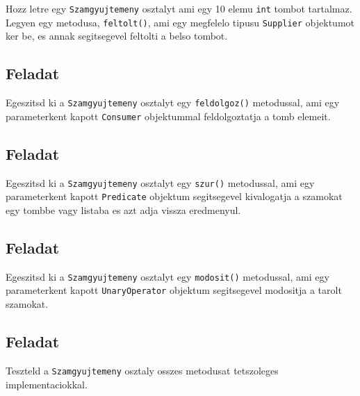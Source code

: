 \documentclass{article}
\let\l\lstinline
\begin{document}
Hozz letre egy \l{Szamgyujtemeny} osztalyt ami egy 10 elemu \l{int} tombot tartalmaz. Legyen egy metodusa, \l{feltolt()}, ami egy megfelelo tipusu \l{Supplier} objektumot ker be, es annak segitsegevel feltolti a belso tombot.

\subsection{Feladat}

Egeszitsd ki a \l{Szamgyujtemeny} osztalyt egy \l{feldolgoz()} metodussal, ami egy parameterkent kapott \l{Consumer} objektummal feldolgoztatja a tomb elemeit.

\subsection{Feladat}

Egeszitsd ki a \l{Szamgyujtemeny} osztalyt egy \l{szur()} metodussal, ami egy parameterkent kapott \l{Predicate} objektum segitsegevel kivalogatja a szamokat egy tombbe vagy listaba es azt adja vissza eredmenyul.

\subsection{Feladat}

Egeszitsd ki a \l{Szamgyujtemeny} osztalyt egy \l{modosit()} metodussal, ami egy parameterkent kapott \l{UnaryOperator} objektum segitsegevel modositja a tarolt szamokat.

\subsection{Feladat}

Teszteld a \l{Szamgyujtemeny} osztaly osszes metodusat tetszoleges implementaciokkal.
\end{document}
